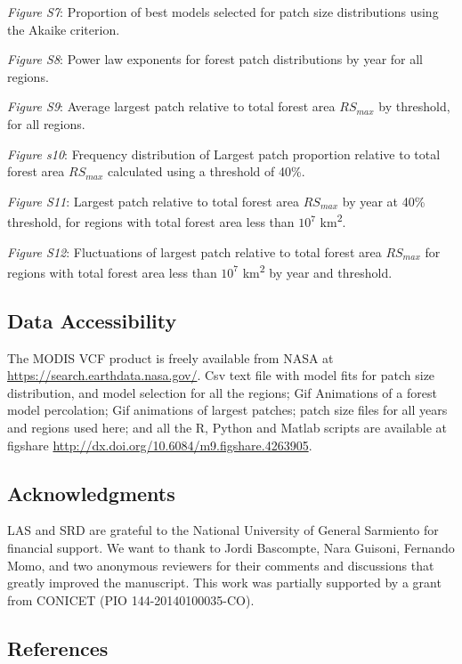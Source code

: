 \documentclass[]{article}
\begin{document}
\emph{Figure S7}: Proportion of best models selected for patch size
distributions using the Akaike criterion.

\emph{Figure S8}: Power law exponents for forest patch distributions by
year for all regions.

\emph{Figure S9}: Average largest patch relative to total forest area
\(RS_{max}\) by threshold, for all regions.

\emph{Figure s10}: Frequency distribution of Largest patch proportion
relative to total forest area \(RS_{max}\) calculated using a threshold
of 40\%.

\emph{Figure S11}: Largest patch relative to total forest area
\(RS_{max}\) by year at 40\% threshold, for regions with total forest
area less than \(10^{7}\) km\textsuperscript{2}.

\emph{Figure S12}: Fluctuations of largest patch relative to total
forest area \(RS_{max}\) for regions with total forest area less than
\(10^{7}\) km\textsuperscript{2} by year and threshold.

\subsection{Data Accessibility}\label{data-accessibility}

The MODIS VCF product is freely available from NASA at
\url{https://search.earthdata.nasa.gov/}. Csv text file with model fits
for patch size distribution, and model selection for all the regions;
Gif Animations of a forest model percolation; Gif animations of largest
patches; patch size files for all years and regions used here; and all
the R, Python and Matlab scripts are available at figshare
\url{http://dx.doi.org/10.6084/m9.figshare.4263905}.

\subsection{Acknowledgments}\label{acknowledgments}

LAS and SRD are grateful to the National University of General Sarmiento
for financial support. We want to thank to Jordi Bascompte, Nara
Guisoni, Fernando Momo, and two anonymous reviewers for their comments
and discussions that greatly improved the manuscript. This work was
partially supported by a grant from CONICET (PIO 144-20140100035-CO).

\subsection*{References}\label{references}
\end{document}
